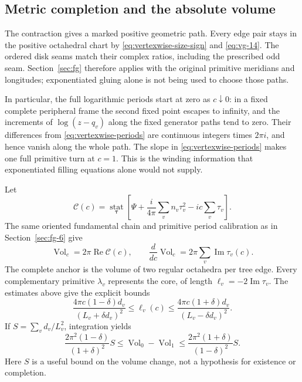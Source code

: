 \subsection{Metric completion and the absolute volume}\label{sec:vg-4}

The contraction gives a marked positive geometric path. Every edge pair
stays in the positive octahedral chart by
\eqref{eq:vertexwise-size-sign} and \eqref{eq:vg-14}. The ordered disk
seams match their complex ratios, including the prescribed odd seam.
Section~\ref{sec:fg} therefore applies with the original primitive
meridians and longitudes; exponentiated gluing alone is not being used
to choose those paths.

In particular, the full logarithmic periods start at zero as \(c\downarrow0\): in a fixed complete peripheral frame the second fixed point escapes to infinity, and the increments of \(\log(z-q_v)\) along the fixed generator paths tend to zero. Their differences from \eqref{eq:vertexwise-periods} are continuous integers times \(2\pi i\), and hence vanish along the whole path. The slope in \eqref{eq:vertexwise-periods} makes one full primitive turn at \(c=1\). This is the winding information that exponentiated filling equations alone would not supply.

Let \begin{equation}\label{eq:vg-18}
\mathcal C(c)=\operatorname*{stat}_{\boldsymbol\tau}
 \left[\Psi+\frac{i}{4\pi}\sum_vn_v\tau_v^2
                         -ic\sum_v\tau_v\right].
\end{equation} The same oriented fundamental chain and primitive period calibration as in Section~\ref{sec:fg-6} give \begin{equation}\label{eq:vg-19}
\operatorname{Vol}_c=2\pi\operatorname{Re}\mathcal C(c),
 \qquad
 \frac{d}{dc}\operatorname{Vol}_c
                      =2\pi\sum_v\operatorname{Im}\tau_v(c).
\end{equation} The complete anchor is the volume of two regular octahedra per tree edge. Every complementary primitive \(\lambda_v\) represents the core, of length \(\ell_v=-2\operatorname{Im}\tau_v\). The estimates above give the explicit bounds \begin{equation}\label{eq:vg-20}
\frac{4\pi c(1-\delta)d_v}{(L_v+\delta d_v)^2}
 \le\ell_v(c)\le
 \frac{4\pi c(1+\delta)d_v}{(L_v-\delta d_v)^2}.
\end{equation} If \(S=\sum_vd_v/L_v^2\), integration yields \begin{equation}\label{eq:vg-21}
\frac{2\pi^2(1-\delta)}{(1+\delta)^2}S
 \le\operatorname{Vol}_0-\operatorname{Vol}_1\le
 \frac{2\pi^2(1+\delta)}{(1-\delta)^2}S.
\end{equation} Here \(S\) is a useful bound on the volume change, not a hypothesis for existence or completion.

